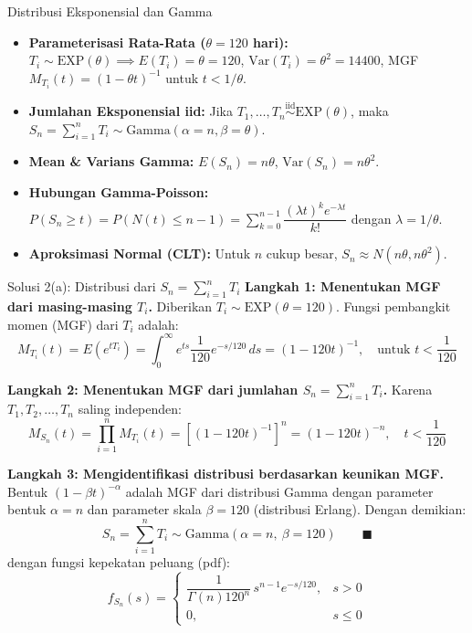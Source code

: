 \documentclass[10pt,twoside]{article}
\begin{document}
\begin{tipbox}{Distribusi Eksponensial dan Gamma}
\begin{itemize}
  \item \textbf{Parameterisasi Rata-Rata ($\theta = 120$ hari):} $T_i \sim \text{EXP}(\theta) \implies E(T_i) = \theta = 120$, $\mathrm{Var}(T_i) = \theta^2 = 14400$, MGF $M_{T_i}(t) = (1 - \theta t)^{-1}$ untuk $t < 1/\theta$.
  \item \textbf{Jumlahan Eksponensial iid:} Jika $T_1, \dots, T_n \overset{\mathrm{iid}}{\sim} \text{EXP}(\theta)$, maka $S_n = \sum_{i=1}^n T_i \sim \text{Gamma}(\alpha = n, \beta = \theta)$.
  \item \textbf{Mean \& Varians Gamma:} $E(S_n) = n\theta$, $\mathrm{Var}(S_n) = n\theta^2$.
  \item \textbf{Hubungan Gamma-Poisson:} $P(S_n \ge t) = P(N(t) \le n - 1) = \sum_{k=0}^{n-1} \dfrac{(\lambda t)^k e^{-\lambda t}}{k!}$ dengan $\lambda = 1/\theta$.
  \item \textbf{Aproksimasi Normal (CLT):} Untuk $n$ cukup besar, $S_n \approx N(n\theta, n\theta^2)$.
\end{itemize}
\end{tipbox}

\begin{solbox}{Solusi 2(a): Distribusi dari $S_n = \sum_{i=1}^n T_i$}
\textbf{Langkah 1: Menentukan MGF dari masing-masing $T_i$.}
Diberikan $T_i \sim \text{EXP}(\theta = 120)$. Fungsi pembangkit momen (MGF) dari $T_i$ adalah:
\[
M_{T_i}(t) = E(e^{tT_i}) = \int_0^\infty e^{ts} \frac{1}{120} e^{-s/120} \, ds = (1 - 120t)^{-1}, \quad \text{untuk } t < \frac{1}{120}
\]

\textbf{Langkah 2: Menentukan MGF dari jumlahan $S_n = \sum_{i=1}^n T_i$.}
Karena $T_1, T_2, \dots, T_n$ saling independen:
\[
M_{S_n}(t) = \prod_{i=1}^n M_{T_i}(t) = \left[(1 - 120t)^{-1}\right]^n = (1 - 120t)^{-n}, \quad t < \frac{1}{120}
\]

\textbf{Langkah 3: Mengidentifikasi distribusi berdasarkan keunikan MGF.}
Bentuk $(1 - \beta t)^{-\alpha}$ adalah MGF dari distribusi Gamma dengan parameter bentuk $\alpha = n$ dan parameter skala $\beta = 120$ (distribusi Erlang).
Dengan demikian:
\[
\boxed{S_n = \sum_{i=1}^n T_i \sim \text{Gamma}(\alpha = n, \ \beta = 120)} \qquad \blacksquare
\]
dengan fungsi kepekatan peluang (pdf):
\[
f_{S_n}(s) = \begin{cases} \dfrac{1}{\Gamma(n) 120^n} \, s^{n-1} e^{-s/120}, & s > 0 \\ 0, & s \le 0 \end{cases}
\]
\end{solbox}
\end{document}

